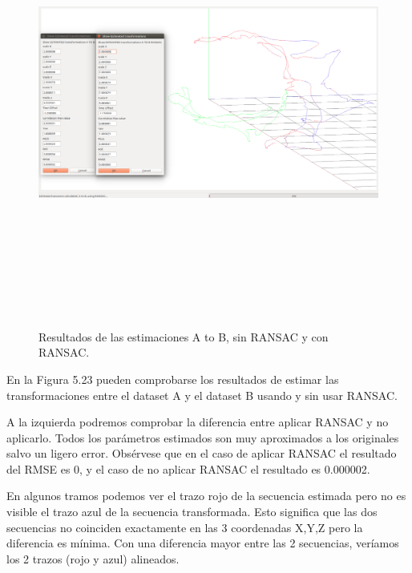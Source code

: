 \begin{figure}[H]
\begin{center}
\label{fig:opciones de View}\includegraphics[height=14.0cm,width=18.0cm]{img/cap6/newData_EscalaTraslaRota_aB.png}
\hspace{0.5cm}

\end{center}

\caption{Resultados de las estimaciones A to B, sin RANSAC y con RANSAC.}
\end{figure}
En la Figura 5.23 pueden comprobarse los resultados de estimar las transformaciones entre el dataset A y el dataset B usando y sin usar RANSAC. 

A la izquierda podremos comprobar la diferencia entre aplicar RANSAC y no aplicarlo. Todos los parámetros estimados son muy aproximados a los originales salvo un ligero error. Obsérvese que en el caso de aplicar RANSAC el resultado del RMSE es 0, y el caso de no aplicar RANSAC el resultado es 0.000002.

En algunos tramos podemos ver el trazo rojo de la secuencia estimada pero no es visible el trazo azul de la secuencia transformada. Esto significa que las dos secuencias no coinciden exactamente en las 3 coordenadas X,Y,Z pero la diferencia es mínima. Con una diferencia mayor entre las 2 secuencias, veríamos los 2 trazos (rojo y azul) alineados.


